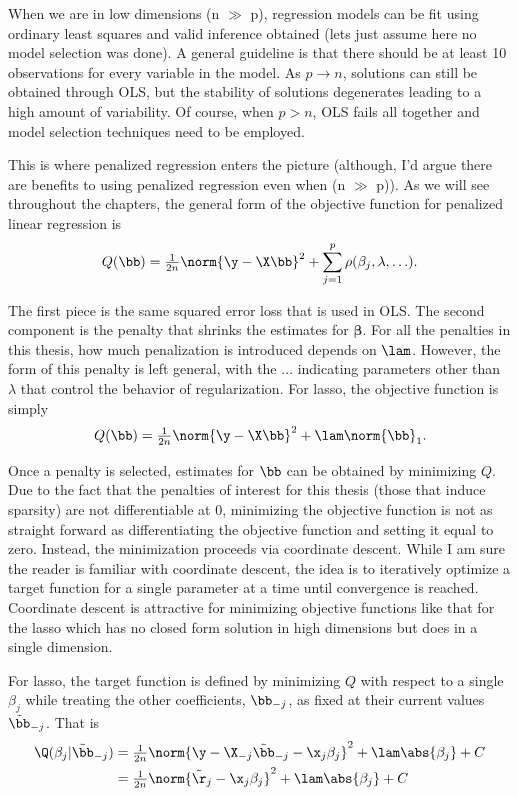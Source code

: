 When we are in low dimensions (n $\gg$ p), regression models can be fit using ordinary least squares and valid inference obtained (lets just assume here no model selection was done). A general guideline is that there should be at least 10 observations for every variable in the model. As $p \rightarrow n$, solutions can still be obtained through OLS, but the stability of solutions degenerates leading to a high amount of variability. Of course, when $p > n$, OLS fails all together and model selection techniques need to be employed.

This is where penalized regression enters the picture (although, I'd argue there are benefits to using penalized regression even when (n $\gg$ p)). As we will see throughout the chapters, the general form of the objective function for penalized linear regression is
$$
Q(\bb) = \tfrac{1}{2n}\norm{\y - \X\bb}^2 + \sum_{j = 1}^p \rho(\beta_j, \lambda, \ldots).
$$

\noindent The first piece is the same squared error loss that is used in OLS. The second component is the penalty that shrinks the estimates for $\boldsymbol{\beta}$. For all the penalties in this thesis, how much penalization is introduced depends on $\lam$. However, the form of this penalty is left general, with the $\ldots$ indicating parameters other than $\lambda$ that control the behavior of regularization. For lasso, the objective function is simply
$$
Q(\bb) = \tfrac{1}{2n}\norm{\y - \X\bb}^2 + \lam \norm{\bb}_1.
$$

Once a penalty is selected, estimates for $\bb$ can be obtained by minimizing $Q$. Due to the fact that the penalties of interest for this thesis (those that induce sparsity) are not differentiable at 0, minimizing the objective function is not as straight forward as differentiating the objective function and setting it equal to zero. Instead, the minimization proceeds via coordinate descent. While I am sure the reader is familiar with coordinate descent, the idea is to iteratively optimize a target function for a single parameter at a time until convergence is reached. Coordinate descent is attractive for minimizing objective functions like that for the lasso which has no closed form solution in high dimensions but does in a single dimension.

For lasso, the target function is defined by minimizing $Q$ with respect to a single $\beta_j$ while treating the other coefficients, $\bb_{-j}$, as fixed at their current values $\tilde{\bb}_{-j}$. That is
$$
\begin{aligned}
\Q(\beta_j|\tilde{\bb}_{-j}) &= \tfrac{1}{2n}\norm{\y - \X_{-j}\tilde{\bb}_{-j} - \x_j \beta_j}^2 + \lam \abs{\beta_j} + C \\
&= \tfrac{1}{2n}\norm{\tilde{\r}_j - \x_j \beta_j}^2 + \lam \abs{\beta_j} + C
\end{aligned}
$$

